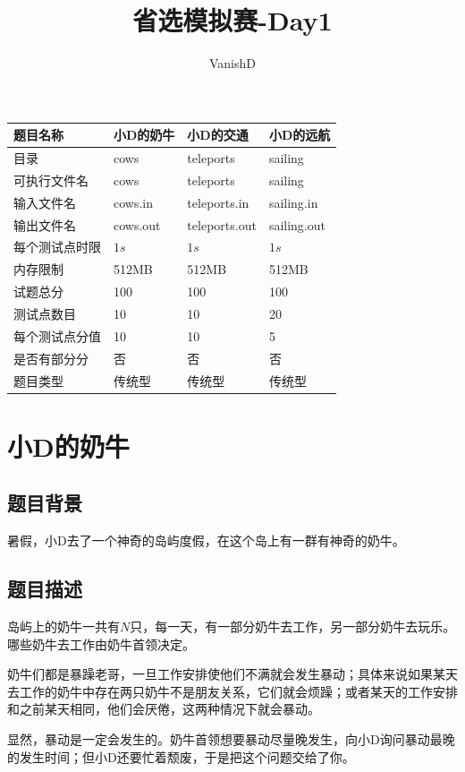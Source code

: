 \documentclass[12pt, a4paper]{article}
\title{省选模拟赛-Day1}
\author{VanishD}
\begin{document}
\maketitle
\begin{tabular}{|p{90pt}|p{90pt}|p{90pt}|p{90pt}|}
	\hline
	题目名称 & 小D的奶牛 & 小D的交通 & 小D的远航 \\
	\hline
	目录 & cows & teleports & sailing \\
	\hline
	可执行文件名 & cows & teleports & sailing \\
	\hline
	输入文件名 & cows.in & teleports.in & sailing.in \\
	\hline
	输出文件名 & cows.out & teleports.out & sailing.out \\
	\hline
	每个测试点时限 & $1s$ & $1s$ & $1s$ \\
	\hline
	内存限制 & 512MB & 512MB & 512MB \\
	\hline
	试题总分 & 100 & 100 & 100 \\
	\hline
	测试点数目 & 10 & 10 & 20 \\
	\hline
	每个测试点分值 & 10 & 10 & 5 \\
	\hline
	是否有部分分 & 否 & 否 & 否 \\
	\hline
	题目类型 & 传统型 & 传统型 & 传统型 \\
    \hline
\end{tabular}

\newpage
\section{小D的奶牛}
\subsection{题目背景}
	暑假，小D去了一个神奇的岛屿度假，在这个岛上有一群有神奇的奶牛。
\subsection{题目描述}

	岛屿上的奶牛一共有$N$只，每一天，有一部分奶牛去工作，另一部分奶牛去玩乐。哪些奶牛去工作由奶牛首领决定。

	奶牛们都是暴躁老哥，一旦工作安排使他们不满就会发生暴动；具体来说如果某天去工作的奶牛中存在两只奶牛不是朋友关系，它们就会烦躁；或者某天的工作安排和之前某天相同，他们会厌倦，这两种情况下就会暴动。

	显然，暴动是一定会发生的。奶牛首领想要暴动尽量晚发生，向小D询问暴动最晚的发生时间；但小D还要忙着颓废，于是把这个问题交给了你。
\end{document}
